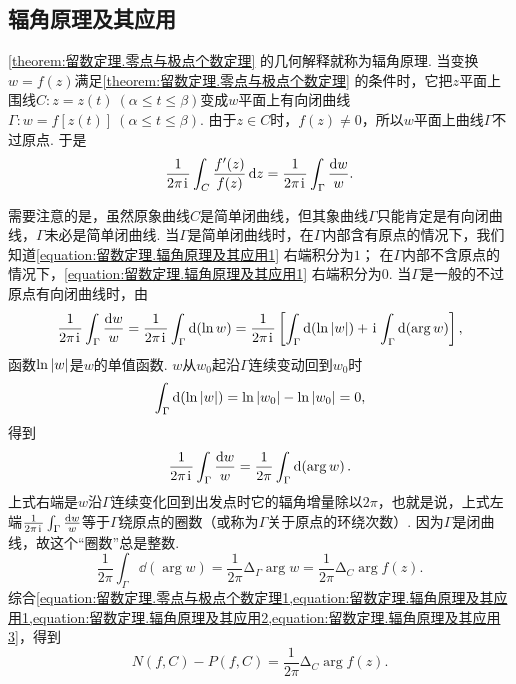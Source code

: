 \subsection{辐角原理及其应用}
\cref{theorem:留数定理.零点与极点个数定理} 的几何解释就称为辐角原理.
当变换\(w = f(z)\)满足\cref{theorem:留数定理.零点与极点个数定理} 的条件时，它把\(z\)平面上围线\(C: z = z(t)\ (\alpha \leqslant t \leqslant \beta)\)变成\(w\)平面上有向闭曲线\(\Gamma: w = f[z(t)]\ (\alpha \leqslant t \leqslant \beta)\).
由于\(z \in C\)时，\(f(z)\neq0\)，所以\(w\)平面上曲线\(\Gamma\)不过原点.
于是\begin{equation}\label{equation:留数定理.辐角原理及其应用1}
\frac{1}{2\pi\kern1pt\mathrm{i}\kern1pt} \int_C \frac{f'(z)}{f(z)} \dd{z}
= \frac{1}{2\pi\kern1pt\mathrm{i}\kern1pt} \int_{\Gamma} \frac{\dd{w}}{w}.
\end{equation}

需要注意的是，虽然原象曲线\(C\)是简单闭曲线，但其象曲线\(\Gamma\)只能肯定是有向闭曲线，\(\Gamma\)未必是简单闭曲线.
当\(\Gamma\)是简单闭曲线时，在\(\Gamma\)内部含有原点的情况下，我们知道\cref{equation:留数定理.辐角原理及其应用1} 右端积分为\(1\)；
在\(\Gamma\)内部不含原点的情况下，\cref{equation:留数定理.辐角原理及其应用1} 右端积分为\(0\).
当\(\Gamma\)是一般的不过原点有向闭曲线时，由\[
\frac{1}{2\pi\kern1pt\mathrm{i}\kern1pt} \int_{\Gamma} \frac{\dd{w}}{w}
= \frac{1}{2\pi\kern1pt\mathrm{i}\kern1pt} \int_{\Gamma} \dd(\ln w)
= \frac{1}{2\pi\kern1pt\mathrm{i}\kern1pt} \left[ \int_{\Gamma} \dd(\ln\abs{w}) + \kern1pt\mathrm{i}\kern1pt \int_{\Gamma} \dd(\arg w) \right],
\]函数\(\ln\abs{w}\)是\(w\)的单值函数.
\(w\)从\(w_0\)起沿\(\Gamma\)连续变动回到\(w_0\)时\[
\int_{\Gamma} \dd(\ln\abs{w})
= \ln\abs{w_0} - \ln\abs{w_0} = 0,
\]得到\begin{equation}\label{equation:留数定理.辐角原理及其应用2}
\frac{1}{2\pi\kern1pt\mathrm{i}\kern1pt} \int_{\Gamma} \frac{\dd{w}}{w}
= \frac{1}{2\pi} \int_{\Gamma} \dd(\arg w).
\end{equation}
上式右端是\(w\)沿\(\Gamma\)连续变化回到出发点时它的辐角增量除以\(2\pi\)，也就是说，上式左端\(\frac{1}{2\pi\kern1pt\mathrm{i}\kern1pt} \int_{\Gamma} \frac{\dd{w}}{w}\)等于\(\Gamma\)绕原点的圈数（或称为\(\Gamma\)关于原点的环绕次数）.
因为\(\Gamma\)是闭曲线，故这个“圈数”总是整数.
\begin{equation}\label{equation:留数定理.辐角原理及其应用3}
\frac{1}{2\pi} \int_{\Gamma} \dd(\arg w)
= \frac{1}{2\pi} \increment_{\Gamma} \arg w
= \frac{1}{2\pi} \increment_C \arg f(z).
\end{equation}
综合\cref{equation:留数定理.零点与极点个数定理1,equation:留数定理.辐角原理及其应用1,equation:留数定理.辐角原理及其应用2,equation:留数定理.辐角原理及其应用3}，得到\begin{equation}\label{equation:留数定理.辐角原理及其应用4}
N(f,C)-P(f,C) = \frac{1}{2\pi} \increment_C \arg f(z).
\end{equation}

